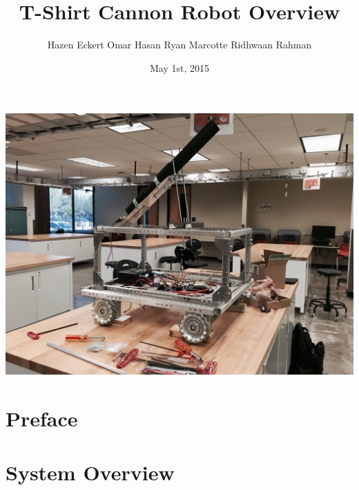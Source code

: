 \documentclass[letterpaper,12pt]{article}
\begin{document}
\title{T-Shirt Cannon Robot Overview}
\author{Hazen Eckert \hspace{3mm} Omar Hasan \hspace{3mm} Ryan Marcotte \hspace{3mm} Ridhwaan Rahman}
\date{May 1st, 2015}
\maketitle

\begin{center}
    \includegraphics[width=15cm]{./pics/chassis/robot.jpg}
\end{center}

\pagebreak

\tableofcontents

\section*{Preface}

\section{System Overview}
\end{document}
